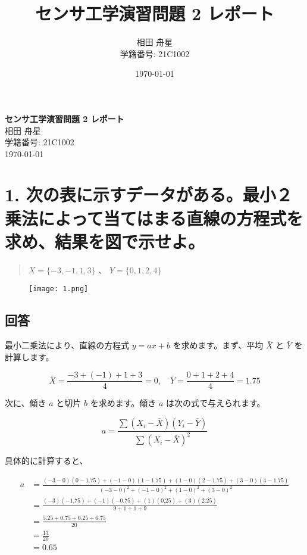 \documentclass{article}
\title{センサ工学演習問題 2 レポート}
\author{相田 舟星\\学籍番号: 21C1002}
\date{\today}
\begin{document}
\begin{titlepage}
    \centering
    \vspace*{\fill}
    {\huge \textbf{センサ工学演習問題 2 レポート}}\\[1.5cm]
    {\Large 相田 舟星}\\
    {\Large 学籍番号: 21C1002}\\[2cm]
    {\large \today}
    \vspace*{\fill}
\end{titlepage}

\newpage

\section*{1. 次の表に示すデータがある。最小２乗法によって当てはまる直線の方程式を求め、結果を図で示せよ。}
\begin{quote}
    \(X = \{-3, -1, 1, 3\}\) 、 \(Y = \{0, 1, 2, 4\}\)
\end{quote}
\begin{figure}[H]
    \centering
    \texttt{[image: 1.png]}
\end{figure}

\subsection*{回答}
最小二乗法により、直線の方程式 \(y = ax + b\) を求めます。まず、平均 \(\bar{X}\) と \(\bar{Y}\) を計算します。

\[
\bar{X} = \frac{-3 + (-1) + 1 + 3}{4} = 0, \quad \bar{Y} = \frac{0 + 1 + 2 + 4}{4} = 1.75
\]

次に、傾き \(a\) と切片 \(b\) を求めます。傾き \(a\) は次の式で与えられます。

\[
a = \frac{\sum (X_i - \bar{X})(Y_i - \bar{Y})}{\sum (X_i - \bar{X})^2}
\]

具体的に計算すると、

\[
\begin{aligned}
a &= \frac{(-3 - 0)(0 - 1.75) + (-1 - 0)(1 - 1.75) + (1 - 0)(2 - 1.75) + (3 - 0)(4 - 1.75)}{(-3 - 0)^2 + (-1 - 0)^2 + (1 - 0)^2 + (3 - 0)^2} \\
&= \frac{(-3)(-1.75) + (-1)(-0.75) + (1)(0.25) + (3)(2.25)}{9 + 1 + 1 + 9} \\
&= \frac{5.25 + 0.75 + 0.25 + 6.75}{20} \\
&= \frac{13}{20} \\
&= 0.65
\end{aligned}
\]
\end{document}
